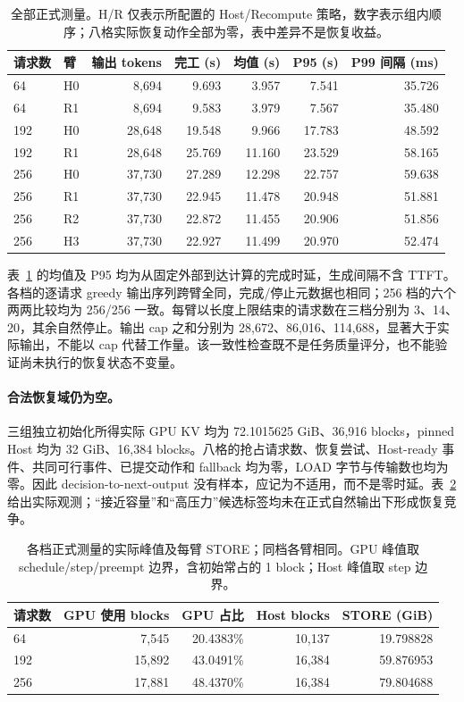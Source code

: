 \documentclass[UTF8,fontset=fandol,a4paper,10pt]{ctexart}
\begin{document}
\begin{table}[ht]
\centering\small
\caption{全部正式测量。H/R 仅表示所配置的 Host/Recompute 策略，数字表示组内顺序；八格实际恢复动作全部为零，表中差异不是恢复收益。}
\label{tab:mainresults}
\begin{tabular}{@{}llrrrrr@{}}
\toprule
请求数 & 臂 & 输出 tokens & 完工 (s) & 均值 (s) & P95 (s) & P99 间隔 (ms) \\
\midrule
64  & H0 & 8,694  & 9.693  & 3.957  & 7.541  & 35.726 \\
64  & R1 & 8,694  & 9.583  & 3.979  & 7.567  & 35.480 \\
192 & H0 & 28,648 & 19.548 & 9.966  & 17.783 & 48.592 \\
192 & R1 & 28,648 & 25.769 & 11.160 & 23.529 & 58.165 \\
256 & H0 & 37,730 & 27.289 & 12.298 & 22.757 & 59.638 \\
256 & R1 & 37,730 & 22.945 & 11.478 & 20.948 & 51.881 \\
256 & R2 & 37,730 & 22.872 & 11.455 & 20.906 & 51.856 \\
256 & H3 & 37,730 & 22.927 & 11.499 & 20.970 & 52.474 \\
\bottomrule
\end{tabular}
\end{table}

表~\ref{tab:mainresults} 的均值及 P95 均为从固定外部到达计算的完成时延，生成间隔不含 TTFT。各档的逐请求 greedy 输出序列跨臂全同，完成/停止元数据也相同；256 档的六个两两比较均为 256/256 一致。每臂以长度上限结束的请求数在三档分别为 3、14、20，其余自然停止。输出 cap 之和分别为 28,672、86,016、114,688，显著大于实际输出，不能以 cap 代替工作量。该一致性检查既不是任务质量评分，也不能验证尚未执行的恢复状态不变量。

\paragraph{合法恢复域仍为空。}
三组独立初始化所得实际 GPU KV 均为 72.1015625 GiB、36,916 blocks，pinned Host 均为 32 GiB、16,384 blocks。八格的抢占请求数、恢复尝试、Host-ready 事件、共同可行事件、已提交动作和 fallback 均为零，LOAD 字节与传输数也均为零。因此 decision-to-next-output 没有样本，应记为不适用，而不是零时延。表~\ref{tab:capacityresults} 给出实际观测；“接近容量”和“高压力”候选标签均未在正式自然输出下形成恢复竞争。

\begin{table}[ht]
\centering\small
\caption{各档正式测量的实际峰值及每臂 STORE；同档各臂相同。GPU 峰值取 schedule/step/preempt 边界，含初始常占的 1 block；Host 峰值取 step 边界。}
\label{tab:capacityresults}
\begin{tabular}{@{}lrrrr@{}}
\toprule
请求数 & GPU 使用 blocks & GPU 占比 & Host blocks & STORE (GiB) \\
\midrule
64  & 7,545  & 20.4383\% & 10,137 & 19.798828 \\
192 & 15,892 & 43.0491\% & 16,384 & 59.876953 \\
256 & 17,881 & 48.4370\% & 16,384 & 79.804688 \\
\bottomrule
\end{tabular}
\end{table}
\end{document}
